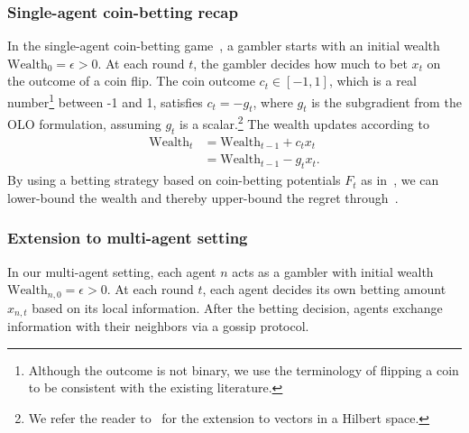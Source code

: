 \documentclass[journal]{IEEEtran}
\newcommand{\w}{\text{Wealth}}
\begin{document}
\subsubsection*{Single-agent coin-betting recap}

In the single-agent coin-betting game~\cite{orabona_coin_2016}, a gambler starts with an initial wealth $\w_0 = \epsilon > 0$.
At each round $t$, the gambler decides how much to bet $x_t$ on the outcome of a coin flip.
The coin outcome $c_t \in [-1,1]$, which is a real number\footnote{Although the outcome is not binary, we use the terminology of flipping a coin to be consistent with the existing literature.} between -1 and 1, satisfies $c_t = -g_t$, where $g_t$ is the subgradient from the OLO formulation, assuming $g_t$ is a scalar.\footnote{We refer the reader to~\cite{orabona_coin_2016} for the extension to vectors in a Hilbert space.}
The wealth updates according to
\begin{align}
    \w_t & = \w_{t-1} + c_t x_t  \\
         & = \w_{t-1} - g_t x_t.
\end{align}
By using a betting strategy based on coin-betting potentials $F_t$ as in~, we can lower-bound the wealth and thereby upper-bound the regret through~.

\subsubsection*{Extension to multi-agent setting}

In our multi-agent setting, each agent $n$ acts as a gambler with initial wealth $\w_{n,0} = \epsilon > 0$.
At each round $t$, each agent decides its own betting amount $x_{n,t}$ based on its local information.
After the betting decision, agents exchange information with their neighbors via a gossip protocol.
\end{document}
